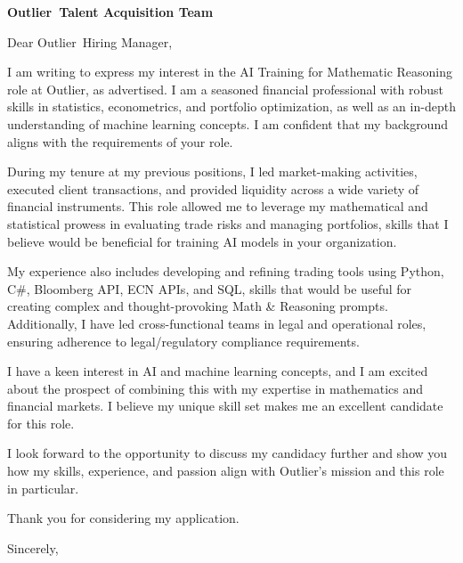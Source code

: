 \documentclass{letter}
\newcommand{\company}{Outlier}
\begin{document}
\begin{letter}{\textbf{\company\ Talent Acquisition Team} \\}

\opening{Dear \company\ Hiring Manager,}

I am writing to express my interest in the AI Training for Mathematic Reasoning role at Outlier, as advertised. I am a seasoned financial professional with robust skills in statistics, econometrics, and portfolio optimization, as well as an in-depth understanding of machine learning concepts. I am confident that my background aligns with the requirements of your role.

During my tenure at my previous positions, I led market-making activities, executed client transactions, and provided liquidity across a wide variety of financial instruments. This role allowed me to leverage my mathematical and statistical prowess in evaluating trade risks and managing portfolios, skills that I believe would be beneficial for training AI models in your organization.

My experience also includes developing and refining trading tools using Python, C\#, Bloomberg API, ECN APIs, and SQL, skills that would be useful for creating complex and thought-provoking Math \& Reasoning prompts. Additionally, I have led cross-functional teams in legal and operational roles, ensuring adherence to legal/regulatory compliance requirements.

I have a keen interest in AI and machine learning concepts, and I am excited about the prospect of combining this with my expertise in mathematics and financial markets. I believe my unique skill set makes me an excellent candidate for this role.

I look forward to the opportunity to discuss my candidacy further and show you how my skills, experience, and passion align with Outlier's mission and this role in particular.

Thank you for considering my application.



\closing{Sincerely,}

\end{letter}
\end{document}

